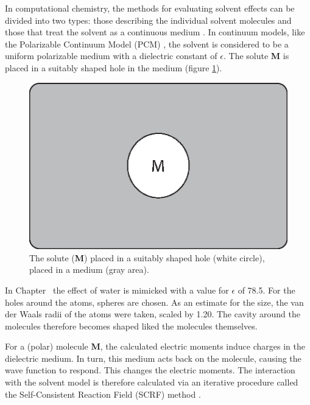 In computational chemistry, the methods for evaluating solvent effects can be divided into two types: those describing the individual solvent molecules and those that treat the solvent as a continuous medium \cite{jensen}. In continuum models, like the Polarizable Continuum Model (PCM) \cite{pcm1,pcm2}, the solvent is considered to be a uniform polarizable medium with a dielectric constant of $\epsilon$. The solute \textbf{M} is placed in a suitably shaped hole in the medium (figure \ref{ch1.fig.continuum}).
\begin{figure}
\center
\includegraphics[scale=0.6]{introduction/figures/continuum.eps}
\caption{The solute (\textbf{M}) placed in a suitably shaped hole (white circle), placed in a medium (gray area).}
\label{ch1.fig.continuum}
\end{figure}
In Chapter \chdissociation\ the effect of water is mimicked with a value for $\epsilon$ of 78.5. For the holes around the atoms, spheres are chosen. As an estimate for the size, the van der Waals radii of the atoms were taken, scaled by 1.20. The cavity around the molecules therefore becomes shaped liked the molecules themselves. 

For a (polar) molecule \textbf{M}, the calculated electric moments induce charges in the dielectric medium. In turn, this medium acts back on the molecule, causing the wave function to respond. This changes the electric moments. The interaction with the solvent model is therefore calculated via an iterative procedure called the Self-Consistent Reaction Field (SCRF) method \cite{jensen}.

